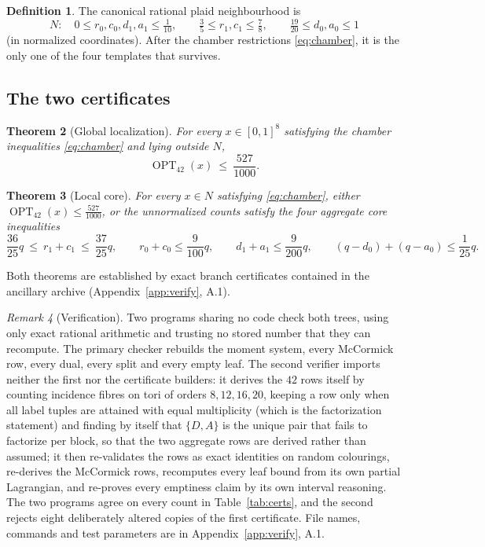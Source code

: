 \documentclass[11pt]{amsart}
\newtheorem{theorem}{Theorem}
\theoremstyle{definition}
\newtheorem{definition}[theorem]{Definition}
\theoremstyle{remark}
\newtheorem{remark}[theorem]{Remark}
\newcommand{\OPT}{\operatorname{OPT}_{42}}
\begin{document}
\begin{definition}\label{def:N}
The canonical rational plaid neighbourhood is
\begin{equation}\label{eq:N}
N:\quad 0\le r_0,c_0,d_1,a_1\le\tfrac1{10},\qquad \tfrac35\le r_1,c_1\le\tfrac78,\qquad \tfrac{19}{20}\le d_0,a_0\le1
\end{equation}
(in normalized coordinates). After the chamber restrictions \eqref{eq:chamber}, it is the only one of the four templates that survives.
\end{definition}

\subsection{The two certificates}

\begin{theorem}[Global localization]\label{thm:cert1}
For every $x\in[0,1]^8$ satisfying the chamber inequalities \eqref{eq:chamber} and lying outside $N$,
\[
\OPT(x)\ \le\ \frac{527}{1000}.
\]
\end{theorem}

\begin{theorem}[Local core]\label{thm:cert2}
For every $x\in N$ satisfying \eqref{eq:chamber}, either $\OPT(x)\le\frac{527}{1000}$, or the unnormalized counts satisfy the four \emph{aggregate core} inequalities
\begin{equation}\label{eq:core}
\frac{36}{25}q\ \le\ r_1+c_1\ \le\ \frac{37}{25}q,
\qquad
r_0+c_0\le\frac{9}{100}q,
\qquad
d_1+a_1\le\frac{9}{200}q,
\qquad
(q-d_0)+(q-a_0)\le\frac{1}{25}q .
\end{equation}
\end{theorem}

Both theorems are established by exact branch certificates contained in the ancillary archive (Appendix~\ref{app:verify}, A.1).

\begin{remark}[Verification]\label{rem:certverify}
Two programs sharing no code check both trees, using only exact rational
arithmetic and trusting no stored number that they can recompute.  The
primary checker rebuilds the moment system, every McCormick row, every dual,
every split and every empty leaf.  The second verifier imports neither the
first nor the certificate builders: it derives the $42$ rows itself by
counting incidence fibres on tori of orders $8,12,16,20$, keeping a row only
when all label tuples are attained with equal multiplicity (which is the
factorization statement) and finding by itself that $\{D,A\}$ is the unique
pair that fails to factorize per block, so that the two aggregate rows are
derived rather than assumed; it then re-validates the rows as exact
identities on random colourings, re-derives the McCormick rows, recomputes
every leaf bound from its own partial Lagrangian, and re-proves every
emptiness claim by its own interval reasoning.  The two programs agree on
every count in Table~\ref{tab:certs}, and the second rejects eight
deliberately altered copies of the first certificate.  File names, commands
and test parameters are in Appendix~\ref{app:verify}, A.1.
\end{remark}
\end{document}
